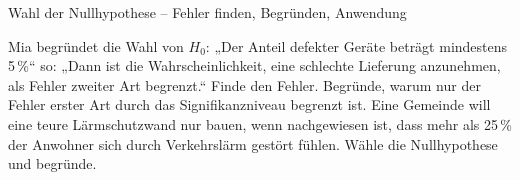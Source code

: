 \begin{aufgabe}{Wahl der Nullhypothese – Fehler finden, Begründen, Anwendung}
\begin{teile}
\teil Mia begründet die Wahl von $H_0$: „Der Anteil defekter Geräte beträgt mindestens 5\,\%“ so: „Dann ist die Wahrscheinlichkeit, eine schlechte Lieferung anzunehmen, als Fehler zweiter Art begrenzt.“ Finde den Fehler.
\teil Begründe, warum nur der Fehler erster Art durch das Signifikanzniveau begrenzt ist.
\teil Eine Gemeinde will eine teure Lärmschutzwand nur bauen, wenn nachgewiesen ist, dass mehr als 25\,\% der Anwohner sich durch Verkehrslärm gestört fühlen. Wähle die Nullhypothese und begründe.
\end{teile}
\end{aufgabe}
